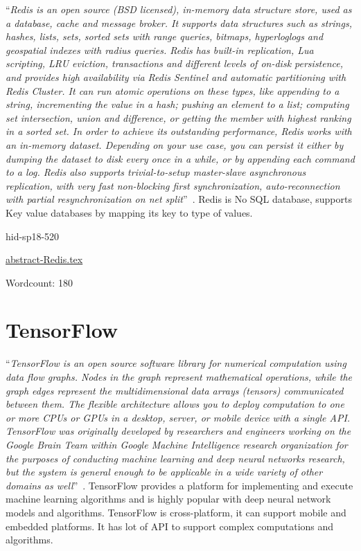 \color{blue}``\emph{Redis is an open source (BSD licensed), in-memory data structure store, used
as a database, cache and message broker. It supports data structures such as
strings, hashes, lists, sets, sorted sets with range queries, bitmaps, 
hyperloglogs and geospatial indexes with radius queries. Redis has built-in 
replication, Lua scripting, LRU eviction, transactions and different levels 
of on-disk persistence, and provides high availability via Redis Sentinel and
automatic partitioning with Redis Cluster.
It can run atomic operations on these types, like appending to a string, 
incrementing the value in a hash; pushing an element to a list; computing set
intersection, union and difference, or getting the member with highest 
ranking in a sorted set.
In order to achieve its outstanding performance, Redis works with an in-memory
dataset. Depending on your use case, you can persist it either by dumping the
dataset to disk every once in a while, or by appending each command to a log.
Redis also supports trivial-to-setup master-slave asynchronous replication, 
with very fast non-blocking first synchronization, auto-reconnection with 
partial resynchronization on net split}''\color{black}~\cite{hid-sp18-520-Redis}.
Redis is No SQL database, supports Key value databases by mapping its key
to type of values.


\begin{IU}

hid-sp18-520

\href{https://github.com/cloudmesh-community/hid-sp18-520/blob/master//technology/abstract-Redis.tex}{abstract-Redis.tex}

 

Wordcount: 180

\end{IU}

\section{TensorFlow}

\color{blue}``\emph{TensorFlow is an open source software library for numerical computation using
data flow graphs. Nodes in the graph represent mathematical operations, while the 
graph edges represent the multidimensional data arrays (tensors) communicated 
between them. The flexible architecture allows you to deploy computation to one 
or more CPUs or GPUs in a desktop, server, or mobile device with a single API. 
TensorFlow was originally developed by researchers and engineers working on the 
Google Brain Team within Google Machine Intelligence research organization for 
the purposes of conducting machine learning and deep neural networks research, 
but the system is general enough to be applicable in a wide variety of other 
domains as well}''\color{black}~\cite{hid-sp18-520-TensorFlow}.
TensorFlow provides a platform for implementing and execute machine learning
algorithms and is highly popular with deep neural network models and algorithms.
TensorFlow is cross-platform, it can support mobile and embedded platforms. It has
lot of API to support complex computations and algorithms.


